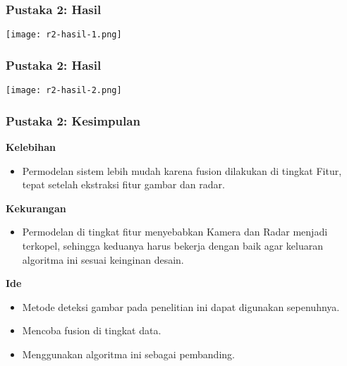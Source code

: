 \begin{frame}
    \frametitle{Pustaka 2: Hasil}
    \centering
    \texttt{[image: r2-hasil-1.png]}
\end{frame}


\begin{frame}
    \frametitle{Pustaka 2: Hasil}
    \centering
    \texttt{[image: r2-hasil-2.png]}
\end{frame}


\begin{frame}
    \frametitle{Pustaka 2: Kesimpulan}

    \large
    \textbf{Kelebihan}\\
    \normalsize
    \begin{itemize}
        \item Permodelan sistem lebih mudah karena fusion dilakukan di tingkat Fitur, tepat setelah ekstraksi fitur gambar dan radar.
    \end{itemize}

    \large
    \textbf{Kekurangan}\\
    \normalsize
    \begin{itemize}
        \item Permodelan di tingkat fitur menyebabkan Kamera dan Radar menjadi terkopel, sehingga keduanya harus bekerja dengan baik agar keluaran algoritma ini sesuai keinginan desain.
    \end{itemize}

    \large
    \textbf{Ide}\\
    \normalsize
    \begin{itemize}
        \item Metode deteksi gambar pada penelitian ini dapat digunakan sepenuhnya.
        \item Mencoba fusion di tingkat data.
        \item Menggunakan algoritma ini sebagai pembanding.
    \end{itemize}

\end{frame}
